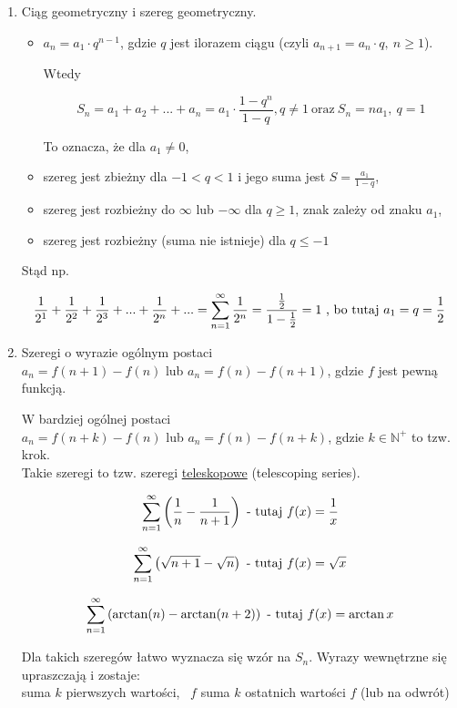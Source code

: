 \begin{enumerate}
    \item Ciąg geometryczny i szereg geometryczny.
    \begin{itemize}
        \item 
        $ a_n = a_1 \cdot q^{n-1} $, gdzie $q$ jest ilorazem ciągu (czyli $a_{n+1} = a_n \cdot q , \ n \geq 1$).
        
        Wtedy

        $$ S_n = a_1 + a_2 + ... + a_n = a_1 \cdot \frac{1 - q^n}{1 - q}, q \neq 1 \ \textrm{oraz} \ S_n = na_1, \ q = 1 $$

        To oznacza, że dla $ a_1 \neq 0 $,

        \item szereg jest zbieżny dla $ -1 < q < 1 $ i jego suma jest $ S = \frac{a_1}{1 - q} $,
        \item szereg jest rozbieżny do $\infty$ lub $-\infty$ dla $ q \geq 1 $, znak zależy od znaku $a_1$,
        \item szereg jest rozbieżny (suma nie istnieje) dla $ q \leq -1 $ \\
    \end{itemize}

    Stąd np.

    $$ \frac{1}{2^1} + \frac{1}{2^2} + \frac{1}{2^3} + ... + \frac{1}{2^n} + ... = \suminfty{1} \frac{1}{2^n} =
    \frac{ \frac{1}{2} }{ 1 - \frac{1}{2} } = 1 \ \textrm{, bo tutaj} \ a_1 = q = \frac{1}{2} $$

    \item Szeregi o wyrazie ogólnym postaci \\
    $ a_n = f(n + 1) - f(n)$ lub $ a_n = f(n) - f(n + 1) $, gdzie $f$ jest pewną funkcją.

    W bardziej ogólnej postaci \\
    \quad $ a_n = f(n + k) - f(n) $ lub $ a_n = f(n) - f(n + k) $, gdzie $ k \in \mathbb{N}^+ $ to tzw. krok. \\
    
    Takie szeregi to tzw. szeregi \underline{teleskopowe} (telescoping series).

    \begin{przyklad}

    $$ \sum\limits_{n = 1}^{\infty} \left( \frac{1}{n} - \frac{1}{n + 1} \right) \ \textrm{- tutaj} \ f(x) = \frac{1}{x} $$

    $$ \sum\limits_{n = 1}^{\infty} \left( \sqrt{n + 1} - \sqrt{n} \right) \ \textrm{- tutaj} \ f(x) = \sqrt{x} $$

    $$ \sum\limits_{n = 1}^{\infty} \left( \arctan(n) - \arctan(n+2) \right) \ \textrm{- tutaj} \ f(x) = \arctan x $$
    \end{przyklad}

    Dla takich szeregów łatwo wyznacza się wzór na $S_n$. Wyrazy wewnętrzne się upraszczają i zostaje: \\
    suma $k$ pierwszych wartości, \ $f$ suma $k$ ostatnich wartości $f$ (lub na odwrót) \\

\end{enumerate}

